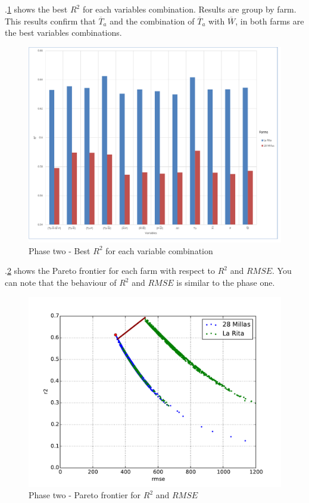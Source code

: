 \documentclass[review,authoryear,english]{elsarticle}
\begin{document}
\figurename $.$\ref{figura10} shows the best $R^2$ for each variables combination. Results are group by farm. This results confirm that $\overline{T}_{a}$ and the combination of $\overline{T}_{a}$ with $\overline{W}$, in both farms are the best variables combinations.

\begin{figure}[H] 
 \centering
 \includegraphics[scale=.5]{Phase_one_Best_R2_for_variables}
 \caption{Phase two - Best $R^2$ for each variable combination} 
 \label{figura10} 
\end{figure}

\figurename $.$\ref{figura11} shows the Pareto frontier for each farm with respect to $R^2$ and $RMSE$.  You can note that the behaviour of $R^2$ and $RMSE$ is similar to the phase one.

\begin{figure}[H] 
 \centering
 \includegraphics[scale=.8]{Phase_two_R2_RMSE}
 \caption{Phase two - Pareto frontier for $R^2$ and $RMSE$} 
 \label{figura11} 
\end{figure}
\end{document}
